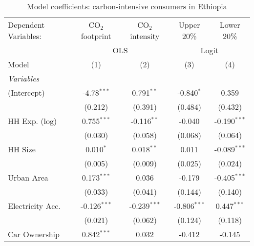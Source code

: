 
\begin{table}[htbp!]
   \centering
   \small
   \begin{adjustbox}{width = 1\textwidth, max height = 0.95\textheight, center}
      \begin{threeparttable}[b]
         \caption{\label{tab:Logit_1_ETH} Model coefficients: carbon-intensive consumers in Ethiopia}
         \begin{tabular}{lcccc}
            \tabularnewline \midrule \midrule
            Dependent Variables: & CO$_{2}$ footprint & CO$_{2}$ intensity & Upper 20\%     & Lower 20\%\\   
             & \multicolumn{2}{c}{OLS} & \multicolumn{2}{c}{Logit} \\ 
            Model                & (1)                & (2)                & (3)            & (4)\\  
            \midrule
            \emph{Variables}\\
            (Intercept)          & -4.78$^{***}$      & 0.791$^{**}$       & -0.840$^{*}$   & 0.359\\   
                                 & (0.212)            & (0.391)            & (0.484)        & (0.432)\\   
            HH Exp. (log)        & 0.755$^{***}$      & -0.116$^{**}$      & -0.040         & -0.190$^{***}$\\   
                                 & (0.030)            & (0.058)            & (0.068)        & (0.064)\\   
            HH Size              & 0.010$^{*}$        & 0.018$^{**}$       & 0.011          & -0.089$^{***}$\\   
                                 & (0.005)            & (0.009)            & (0.025)        & (0.024)\\   
            Urban Area           & 0.173$^{***}$      & 0.036              & -0.179         & -0.405$^{***}$\\   
                                 & (0.033)            & (0.041)            & (0.144)        & (0.140)\\   
            Electricity Acc.     & -0.126$^{***}$     & -0.239$^{***}$     & -0.806$^{***}$ & 0.447$^{***}$\\   
                                 & (0.021)            & (0.062)            & (0.124)        & (0.118)\\   
            Car Ownership        & 0.842$^{***}$      & 0.032              & -0.412         & -0.145\\   

\end{tabular}
\end{threeparttable}
\end{adjustbox}
\end{table}
